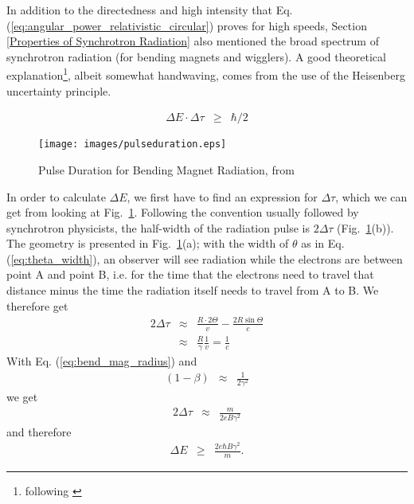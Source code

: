 \documentclass[a4paper,10pt]{article}
\begin{document}
    In addition to the directedness and high intensity that Eq.
(\ref{eq:angular_power_relativistic_circular}) proves for high speeds,
Section \ref{Properties of Synchrotron Radiation} also mentioned the broad
spectrum of synchrotron radiation (for bending magnets and wigglers). A good
theoretical explanation\footnote{following \citep{attwood2000}}, albeit
somewhat handwaving, comes from the use of the Heisenberg uncertainty
principle.

    \begin{eqnarray}
      \Delta E \cdot \Delta \tau &\geq& \hbar / 2
    \end{eqnarray}

\begin{figure}[htbp]
    \centering
    \texttt{[image: images/pulseduration.eps]}
    \caption{Pulse Duration for Bending Magnet Radiation, from
\citep{attwood2000}}
  \label{image:pulseduration}
\end{figure}

    In  order to calculate $\Delta E$, we first have to find an expression for
$\Delta \tau$, which we can get from looking at
Fig.~\ref{image:pulseduration}. Following the convention usually followed by
synchrotron physicists, the half-width of the radiation pulse is $2 \Delta
\tau$ (Fig.~\ref{image:pulseduration}(b)). The geometry is presented in
Fig.~\ref{image:pulseduration}(a); with the width of $\theta$ as in
Eq. (\ref{eq:theta_width}), an observer will see radiation while the electrons are
between point A and point B, i.e. for the time that the electrons need to
travel that distance minus the time the radiation itself needs to travel from A
to B. We therefore get
\begin{eqnarray}
  2 \Delta \tau 
    &\approx& \frac{R \cdot 2 \Theta}{v} - \frac{2R \sin \Theta}{c} \nonumber \\
    &\approx& \frac{R}{\gamma}{\frac{1}{v} = \frac{1}{c}}
\end{eqnarray}
With Eq. (\ref{eq:bend_mag_radius}) and 
\begin{eqnarray}
  (1-\beta) &\approx& \frac{1}{2\gamma^2}
\end{eqnarray}
we get
\begin{eqnarray}
  2 \Delta \tau 
    &\approx& \frac{m}{2eB\gamma^2}
\end{eqnarray}
and therefore
\begin{eqnarray}
  \Delta E &\geq& \frac{2 e \hbar B \gamma^2}{m}.
\end{eqnarray}
\end{document}
